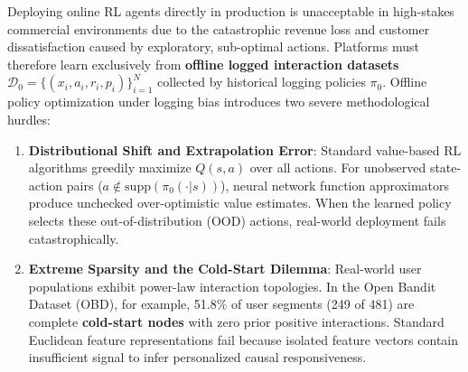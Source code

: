 \documentclass[preprint,12pt,3p]{elsarticle}
\begin{document}
Deploying online RL agents directly in production is unacceptable in high-stakes commercial environments due to the catastrophic revenue loss and customer dissatisfaction caused by exploratory, sub-optimal actions. Platforms must therefore learn exclusively from \textbf{offline logged interaction datasets} $\mathcal{D}_0 = \{(x_i, a_i, r_i, p_i)\}_{i=1}^N$ collected by historical logging policies $\pi_0$. Offline policy optimization under logging bias introduces two severe methodological hurdles:
\begin{enumerate}
    \item \textbf{Distributional Shift and Extrapolation Error}: Standard value-based RL algorithms greedily maximize $Q(s, a)$ over all actions. For unobserved state-action pairs ($a \notin \text{supp}(\pi_0(\cdot|s))$), neural network function approximators produce unchecked over-optimistic value estimates. When the learned policy selects these out-of-distribution (OOD) actions, real-world deployment fails catastrophically.
    \item \textbf{Extreme Sparsity and the Cold-Start Dilemma}: Real-world user populations exhibit power-law interaction topologies. In the Open Bandit Dataset (OBD), for example, 51.8\% of user segments (249 of 481) are complete \textbf{cold-start nodes} with zero prior positive interactions. Standard Euclidean feature representations fail because isolated feature vectors contain insufficient signal to infer personalized causal responsiveness.
\end{enumerate}
\end{document}
